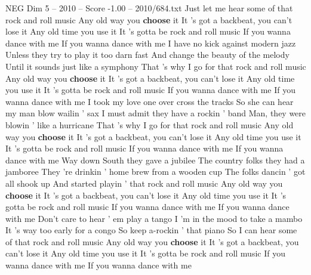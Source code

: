 \begin{textsample}{NEG Dim 5 – 2010 – Score -1.00 – 2010/684.txt}  \label{ex:f5_neg_009}
Just let me hear some of that rock and roll music Any old way you \textbf{choose} it It 's got a backbeat, you can't lose it Any old time you use it It 's gotta be rock and roll music If you wanna dance with me If you wanna dance with me I have no kick against modern jazz Unless they try to play it too darn fast And change the beauty of the melody Until it sounds just like a symphony That 's why I go for that rock and roll music Any old way you \textbf{choose} it It 's got a backbeat, you can't lose it Any old time you use it It 's gotta be rock and roll music If you wanna dance with me If you wanna dance with me I took my love one over cross the tracks So she can hear my man blow wailin ' sax I must admit they have a rockin ' band Man, they were blowin ' like a hurricane That 's why I go for that rock and roll music Any old way you \textbf{choose} it It 's got a backbeat, you can't lose it Any old time you use it It 's gotta be rock and roll music If you wanna dance with me If you wanna dance with me Way down South they gave a jubilee The country folks they had a jamboree They 're drinkin ' home brew from a wooden cup The folks dancin ' got all shook up And started playin ' that rock and roll music Any old way you \textbf{choose} it It 's got a backbeat, you can't lose it Any old time you use it It 's gotta be rock and roll music If you wanna dance with me If you wanna dance with me Don't care to hear ' em play a tango I 'm in the mood to take a mambo It 's way too early for a congo So keep a-rockin ' that piano So I can hear some of that rock and roll music Any old way you \textbf{choose} it It 's got a backbeat, you can't lose it Any old time you use it It 's gotta be rock and roll music If you wanna dance with me If you wanna dance with me

\end{textsample}
